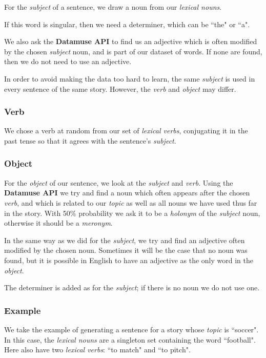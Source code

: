 For the \textit{subject} of a sentence, we draw a noun from our \textit{lexical nouns}.

If this word is singular, then we need a determiner, which can be ``the" or ``a".

We also ask the \textbf{Datamuse API} to find us an adjective which is often modified by the chosen \textit{subject} noun, and is part of our dataset of words. If none are found, then we do not need to use an adjective.

In order to avoid making the data too hard to learn, the same \textit{subject} is used in every sentence of the same story. However, the \textit{verb} and \textit{object} may differ.

\subsubsection{Verb}

We chose a verb at random from our set of \textit{lexical verbs}, conjugating it in the past tense so that it agrees with the sentence's \textit{subject}.

\subsubsection{Object}

For the \textit{object} of our sentence, we look at the \textit{subject} and \textit{verb}. Using the \textbf{Datamuse API} we try and find a noun which often appears after the chosen \textit{verb}, and which is related to our \textit{topic} as well as all nouns we have used thus far in the story. With 50\% probability we ask it to be a \textit{holonym} of the \textit{subject} noun, otherwise it should be a \textit{meronym}.

In the same way as we did for the \textit{subject}, we try and find an adjective often modified by the chosen noun. Sometimes it will be the case that no noun was found, but it is possible in English to have an adjective as the only word in the \textit{object}.

The determiner is added as for the \textit{subject}; if there is no noun we do not use one.

\subsubsection{Example}

We take the example of generating a sentence for a story whose \textit{topic} is ``soccer". In this case, the \textit{lexical nouns} are a singleton set containing the word ``football". Here also have two \textit{lexical verbs}: ``to match" and ``to pitch".

